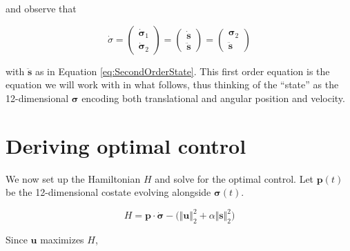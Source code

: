 \documentclass{article}
\begin{document}
and observe that 

\[
\dot{\sigma} 
= \begin{pmatrix} \dot{\bm{\sigma}}_1 \\ \dot{\bm{\sigma}}_2 \end{pmatrix}
= \begin{pmatrix} \dot{\bm{s}} \\ \ddot{\bm{s}} \end{pmatrix} 
= \begin{pmatrix} \bm{\sigma}_2 \\ \ddot{\bm{s}} \end{pmatrix}
\]

with $\ddot{\bm{s}}$ as in Equation \ref{eq:SecondOrderState}. This first order equation is the equation we will work with in what follows, thus thinking of the ``state'' as the 12-dimensional $\bm{\sigma}$ encoding both translational and angular position and velocity.

\section*{Deriving optimal control}

We now set up the Hamiltonian $H$ and solve for the optimal control. Let $\bm{p}(t)$ be the 12-dimensional costate evolving alongside $\bm{\sigma}(t)$.

\begin{equation*}
    H = \bm{p} \cdot \dot{\bm{\sigma}} - \Big( \Vert \mathbf{u} \Vert_2^2 + \alpha \Vert \mathbf{s} \Vert_2^2 \Big)
\end{equation*}

Since $\bm{u}$ maximizes $H$,
\end{document}
